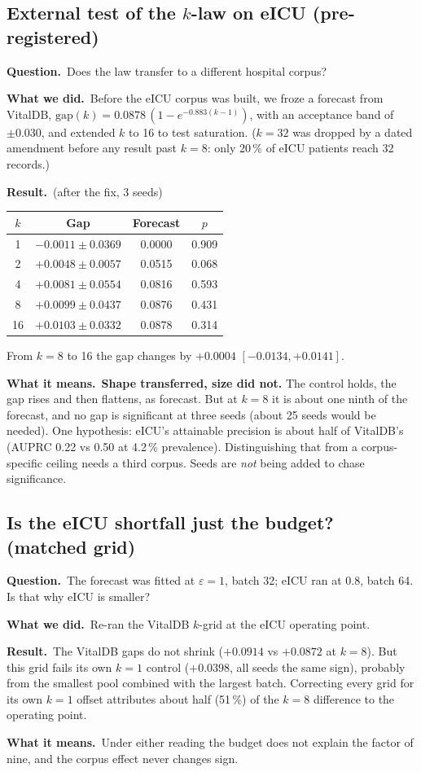 \documentclass[11pt,a4paper]{article}
\newenvironment{experiment}[2]{\subsection{#1}\label{#2}}{}
\newcommand{\Q}{\par\textbf{Question.}\ }
\newcommand{\D}{\par\textbf{What we did.}\ }
\newcommand{\R}{\par\textbf{Result.}\ }
\newcommand{\M}{\par\textbf{What it means.}\ }
\begin{document}
\begin{experiment}{External test of the $k$-law on eICU (pre-registered)}{exp:kext}
\Q Does the law transfer to a different hospital corpus?
\D Before the eICU corpus was built, we froze a forecast from VitalDB,
$\text{gap}(k) = 0.0878\,(1 - e^{-0.883(k-1)})$, with an acceptance band of
$\pm 0.030$, and extended $k$ to 16 to test saturation. ($k = 32$ was dropped
by a dated amendment before any result past $k = 8$: only 20\,\% of eICU
patients reach 32 records.)
\R (after the fix, 3 seeds)
\begin{center}\small
\begin{tabular}{cccc}
\toprule
$k$ & Gap & Forecast & $p$ \\
\midrule
1 & $-0.0011 \pm 0.0369$ & 0.0000 & 0.909 \\
2 & $+0.0048 \pm 0.0057$ & 0.0515 & 0.068 \\
4 & $+0.0081 \pm 0.0554$ & 0.0816 & 0.593 \\
8 & $+0.0099 \pm 0.0437$ & 0.0876 & 0.431 \\
16 & $+0.0103 \pm 0.0332$ & 0.0878 & 0.314 \\
\bottomrule
\end{tabular}
\end{center}
From $k = 8$ to 16 the gap changes by $+0.0004$ $[-0.0134, +0.0141]$.
\M \textbf{Shape transferred, size did not.} The control holds, the gap rises
and then flattens, as forecast. But at $k = 8$ it is about one ninth of the
forecast, and no gap is significant at three seeds (about 25 seeds would be
needed). One hypothesis: eICU's attainable precision is about half of VitalDB's
(AUPRC 0.22 vs 0.50 at 4.2\,\% prevalence). Distinguishing that from a
corpus-specific ceiling needs a third corpus. Seeds are \emph{not} being added
to chase significance.
\end{experiment}

\begin{experiment}{Is the eICU shortfall just the budget? (matched grid)}{exp:matched}
\Q The forecast was fitted at $\varepsilon = 1$, batch 32; eICU ran at 0.8,
batch 64. Is that why eICU is smaller?
\D Re-ran the VitalDB $k$-grid at the eICU operating point.
\R The VitalDB gaps do not shrink ($+0.0914$ vs $+0.0872$ at $k = 8$). But this
grid fails its own $k = 1$ control ($+0.0398$, all seeds the same sign),
probably from the smallest pool combined with the largest batch. Correcting
every grid for its own $k = 1$ offset attributes about half (51\,\%) of the
$k = 8$ difference to the operating point.
\M Under either reading the budget does not explain the factor of nine, and
the corpus effect never changes sign.
\end{experiment}
\end{document}
